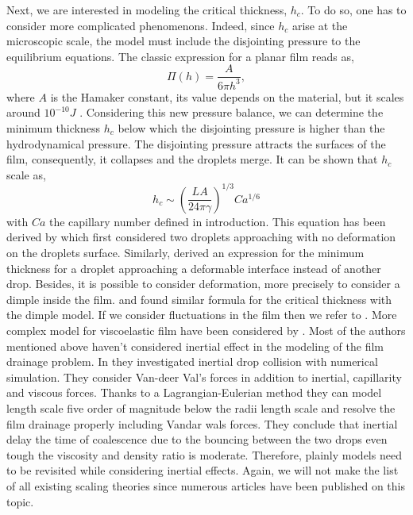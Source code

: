 Next, we are interested in modeling the critical thickness, $h_c$.
To do so, one has to consider more complicated phenomenons.
Indeed, since $h_c$ arise at the microscopic scale, the model must include the disjointing pressure to the equilibrium equations. 
The classic expression for a planar film reads as, 
\begin{equation}
    \Pi(h) = \frac{A}{6\pi h^3},
\end{equation}
where $A$ is the Hamaker constant, its value depends on the material, but it scales around $10^{-10}J$ \citep{leal2007advanced}. 
Considering this new pressure balance, we can determine the minimum thickness $h_c$ below which the disjointing pressure is higher than the hydrodynamical pressure. 
The disjointing pressure attracts the surfaces of the film, consequently, it collapses and the droplets merge. 
It can be shown that $h_c$ scale as, 
\begin{equation}
    h_c \sim \left(\frac{L A}{24\pi\gamma}\right)^{1/3}Ca^{1/6}
\end{equation}
with $Ca$ the capillary number defined in introduction. 
This equation has been derived by \citet{chesters1991modelling} which first considered two droplets approaching with no deformation on the droplets surface.
Similarly, \citet{jones1978film} derived an expression for the minimum thickness for a droplet approaching a deformable interface instead of another drop. 
Besides, it is possible to consider deformation, more precisely to consider a dimple inside the film.
\citet{chesters1991modelling} and \citet{yoon2007coalescence} found similar formula for the critical thickness with the dimple model. 
If we consider fluctuations in the film then we refer to \citet{vrij1966possible}.
More complex model for viscoelastic film have been considered by \citet{bousfield1989thinning}.
Most of the authors mentioned above haven't considered inertial effect in the modeling of the film drainage problem. 
In \citet{sambath2019inertial} they investigated inertial drop collision with numerical simulation.
They consider Van-deer Val's forces in addition to inertial, capillarity and viscous forces.
Thanks to a Lagrangian-Eulerian method they can model length scale five order of magnitude below the radii length scale and resolve the film drainage properly including Vandar wals forces. 
They conclude that inertial delay the time of coalescence due to the bouncing between the two drops even tough the viscosity and density ratio is moderate. 
Therefore, plainly models need to be revisited while considering inertial effects.
Again, we will not make the list of all existing scaling theories since numerous articles have been published on this topic. 

